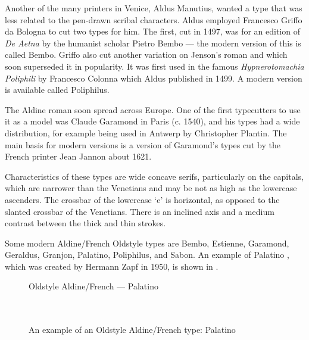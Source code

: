 \documentclass[10pt,a4paper,extrafontsizes]{memoir}
\begin{document}
\begin{paracol}{2}
\switchEng
    Another of the many printers in Venice, 
Aldus Manutius, wanted a type
that was less related to the pen-drawn scribal characters. Aldus employed
Francesco Griffo da Bologna to cut two types
for him.  The first, cut in 1497, was for an edition of \emph{De Aetna} 
by the humanist scholar Pietro Bembo --- the modern
version of this is called Bembo. Griffo also cut another
variation on Jenson's roman and which soon superseded it 
in popularity.
It was first used in the famous \emph{Hypnerotomachia Poliphili} by
Francesco Colonna which Aldus published in 1499.
A modern version is available called Poliphilus.

    The Aldine roman soon spread across Europe. One of the first typecutters
to use it as a model was Claude Garamond 
in Paris (c. 1540), and his types 
had a wide distribution, for example being used in Antwerp by Christopher 
Plantin. The main basis for modern versions
is a version of Garamond's types cut by the French printer 
Jean Jannon about 1621.

    Characteristics of these types are wide concave serifs, particularly
on the capitals, which are narrower than the Venetians and may be not as high
as the lowercase ascenders. The crossbar of the lowercase `e' is horizontal, 
as opposed to the slanted crossbar of the Venetians. There is an inclined axis
and a medium contrast between the thick and thin strokes.

    Some modern Aldine/French Oldstyle types are 
Bembo, 
Estienne, 
Garamond, 
Geraldus, 
Granjon,
Palatino,  
Poliphilus, 
and Sabon.
An example of Palatino%
, 
which was created by Hermann Zapf
in 1950, is shown in .
\end{paracol}

\begin{figure}
\centering
{\centering{}\selectfont
  Oldstyle Aldine/French --- Palatino \\
  \UCalphabet \\
  \LCalphabet \\
  \fox\par}
\caption{An example of an Oldstyle Aldine/French type: Palatino} 
   \label{fig:palatino}
\end{figure}
\end{document}
